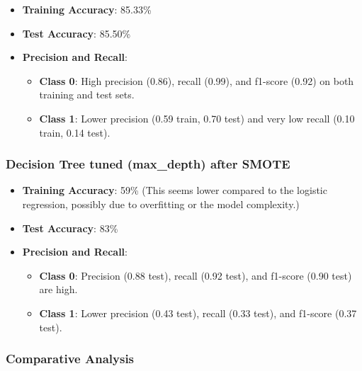 \documentclass[11pt]{article}
\providecommand{\tightlist}{%
      \setlength{\itemsep}{0pt}\setlength{\parskip}{0pt}}
\begin{document}
\begin{itemize}
\tightlist
\item
  \textbf{Training Accuracy}: 85.33\%
\item
  \textbf{Test Accuracy}: 85.50\%
\item
  \textbf{Precision and Recall}:

  \begin{itemize}
  \tightlist
  \item
    \textbf{Class 0}: High precision (0.86), recall (0.99), and f1-score
    (0.92) on both training and test sets.
  \item
    \textbf{Class 1}: Lower precision (0.59 train, 0.70 test) and very
    low recall (0.10 train, 0.14 test).
  \end{itemize}
\end{itemize}

\subsubsection{Decision Tree tuned (max\_depth) after
SMOTE}\label{decision-tree-tuned-max_depth-after-smote}

\begin{itemize}
\tightlist
\item
  \textbf{Training Accuracy}: 59\% (This seems lower compared to the
  logistic regression, possibly due to overfitting or the model
  complexity.)
\item
  \textbf{Test Accuracy}: 83\%
\item
  \textbf{Precision and Recall}:

  \begin{itemize}
  \tightlist
  \item
    \textbf{Class 0}: Precision (0.88 test), recall (0.92 test), and
    f1-score (0.90 test) are high.
  \item
    \textbf{Class 1}: Lower precision (0.43 test), recall (0.33 test),
    and f1-score (0.37 test).
  \end{itemize}
\end{itemize}

\subsubsection{Comparative Analysis}\label{comparative-analysis}
\end{document}
